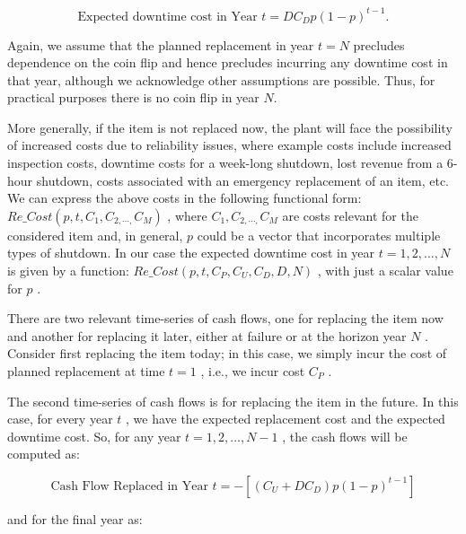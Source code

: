 \begin{equation}\label{npv_3}
\mbox{Expected downtime cost in Year }t=DC_{D}p \left( 1-p \right) ^{t-1}.
\end{equation}


Again, we assume that the planned replacement in year  \( t=N \)  precludes dependence on the coin flip and hence precludes incurring any downtime cost in that year, although we acknowledge other assumptions are possible. Thus, for practical purposes there is no coin flip in year  \( N. \)

More generally, if the item is not replaced now, the plant will face the possibility of increased costs due to reliability issues, where example costs include increased inspection costs, downtime costs for a week-long shutdown, lost revenue from a 6-hour shutdown, costs associated with an emergency replacement of an item, etc. We can express the above costs in the following functional form:  \( Re \_ Cost \left( p,t,C_{1},C_{2, \cdots , }C_{M} \right)  \) , where  \( C_{1},C_{2, \cdots , }C_{M} \)  are costs relevant for the considered item and, in general,  \( p \)  could be a vector that incorporates multiple types of shutdown. In our case the expected downtime cost in year  \( t=1, 2, \ldots ,N \)  is given by a function:  \( Re \_ Cost \left( p,t,C_{P},C_{U},C_{D},D,N \right)  \) , with just a scalar value for  \( p \) .

There are two relevant time-series of cash flows, one for replacing the item now and another for replacing it later, either at failure or at the horizon year  \( N \) . Consider first replacing the item today; in this case, we simply incur the cost of planned replacement at time  \( t=1 \) , i.e., we incur cost  \( C_{P} \) .

The second time-series of cash flows is for replacing the item in the future. In this case, for every year  \( t \) , we have the expected replacement cost and the expected downtime cost. So, for any year  \( t=1, 2, \ldots ,N-1 \) , the cash flows will be computed as:\par




\begin{equation}\label{npv_4}
\mbox{Cash Flow Replaced in Year }t= - \left[  \left( C_{U}+DC_{D} \right)  p \left( 1-p \right) ^{t-1} \right]
\end{equation}


and for the final year as:\par




